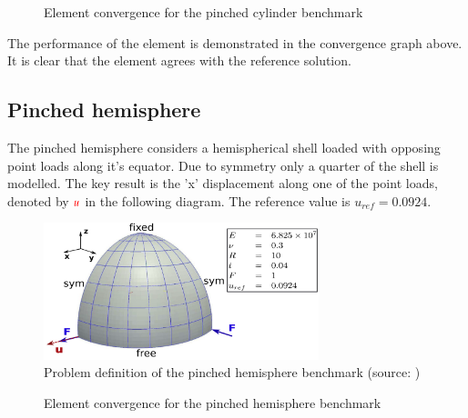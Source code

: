 \pgfplotsset{width=6cm}
\begin{figure}[H]
	\centering
	\caption{Element convergence for the pinched cylinder benchmark}
	\label{pinchedcylinderbench}
\end{figure}



The performance of the element is demonstrated in the convergence graph above. It is clear that the element agrees with the reference solution.

\subsection{Pinched hemisphere}

The pinched hemisphere considers a hemispherical shell loaded with opposing point loads along it's equator. Due to symmetry only a quarter of the shell is modelled. The key result is the 'x' displacement along one of the point loads, denoted by $\textcolor{red}{u}$ in the following diagram. The reference value is $u_{ref} =  0.0924$. 

\begin{figure}[H]
	\centering
	\def\svgwidth{\columnwidth}
	\includegraphics[width=8cm]{images/pinchedhemisphere.png}
	\caption{Problem definition of the pinched hemisphere benchmark (source: \cite{Bou13})}
	\label{pinchedhemisphere}
\end{figure}

\pgfplotsset{width=6cm}
\begin{figure}[H]
	\centering
	\caption{Element convergence for the pinched hemisphere benchmark}
	\label{pinchedhemispherebench}
\end{figure}


